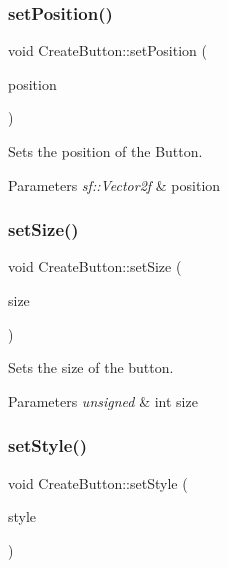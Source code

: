 \subsubsection{\texorpdfstring{set\+Position()}{setPosition()}}
{\footnotesize\ttfamily void Create\+Button\+::set\+Position (\begin{DoxyParamCaption}\item[{sf\+::\+Vector2f}]{position }\end{DoxyParamCaption})}



Sets the position of the Button. 


\begin{DoxyParams}{Parameters}
{\em sf\+::\+Vector2f} & position \\
\hline
\end{DoxyParams}
\mbox{\label{class_create_button_ae9cb9d8d704dd6c4fd307d5e9d1fe8cb}} 
\subsubsection{\texorpdfstring{set\+Size()}{setSize()}}
{\footnotesize\ttfamily void Create\+Button\+::set\+Size (\begin{DoxyParamCaption}\item[{unsigned int}]{size }\end{DoxyParamCaption})}



Sets the size of the button. 


\begin{DoxyParams}{Parameters}
{\em unsigned} & int size \\
\hline
\end{DoxyParams}
\mbox{\label{class_create_button_aa3aac4b884181efb72c06a7dfff97137}} 
\subsubsection{\texorpdfstring{set\+Style()}{setStyle()}}
{\footnotesize\ttfamily void Create\+Button\+::set\+Style (\begin{DoxyParamCaption}\item[{sf\+::\+Uint32}]{style }\end{DoxyParamCaption})}



